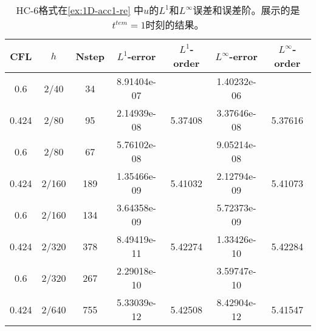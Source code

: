 \def\titleintable{CFL&$h$&Nstep&$L^1$-error&$L^1$-order&$L^\infty$-error&$L^\infty$-order\\}

\begin{table}[htbp]
	\caption{HC-6格式在\cref{ex:1D-acc1-re} 中$u$的$L^1$和$L^\infty$误差和误差阶。展示的是$t^{tem} = 1$时刻的结果。}
	\label{ta:1D-ex1-HC6}
	\centering
	\begin{tabular}{ccccccc}
		\toprule
		\titleintable
		\midrule
		0.6   & 2/40  & 34  & 8.91404e-07 &         & 1.40232e-06 &         \\
		0.424 & 2/80  & 95  & 2.14939e-08 & 5.37408 & 3.37646e-08 & 5.37616 \\
		\midrule
		0.6   & 2/80  & 67  & 5.76102e-08 &         & 9.05214e-08 &         \\
		0.424 & 2/160 & 189 & 1.35466e-09 & 5.41032 & 2.12794e-09 & 5.41073 \\
		\midrule
		0.6   & 2/160 & 134 & 3.64358e-09 &         & 5.72373e-09 &         \\
		0.424 & 2/320 & 378 & 8.49419e-11 & 5.42274 & 1.33426e-10 & 5.42284 \\
		\midrule
		0.6   & 2/320 & 267 & 2.29018e-10 &         & 3.59747e-10 &         \\
		0.424 & 2/640 & 755 & 5.33039e-12 & 5.42508 & 8.42904e-12 & 5.41547 \\
		\bottomrule
	\end{tabular}
\end{table}

